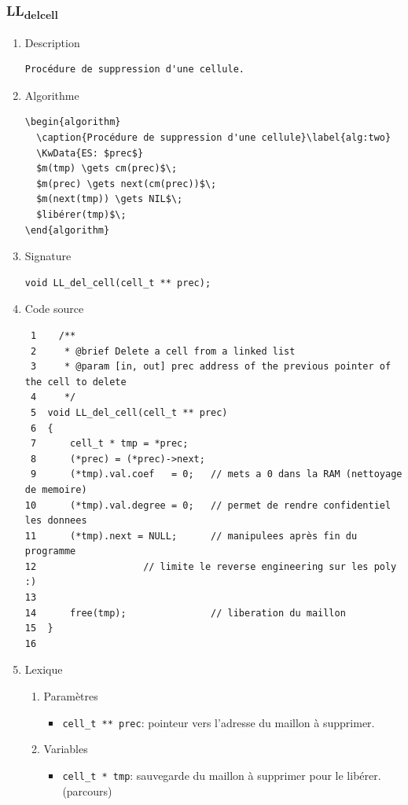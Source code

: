 \documentclass[11pt]{article}
\begin{document}
\subsubsection{LL\textsubscript{del}\textsubscript{cell}}
\label{sec:org275904f}
\begin{enumerate}
\item Description
\label{sec:org4500985}

\begin{verbatim}
Procédure de suppression d'une cellule.
\end{verbatim}

\item Algorithme
\label{sec:org0630d46}

\begin{verbatim}
\begin{algorithm}
  \caption{Procédure de suppression d'une cellule}\label{alg:two}
  \KwData{ES: $prec$}
  $m(tmp) \gets cm(prec)$\;
  $m(prec) \gets next(cm(prec))$\;
  $m(next(tmp)) \gets NIL$\;
  $libérer(tmp)$\;
\end{algorithm}
\end{verbatim}

\item Signature
\label{sec:orgd272dc8}

\begin{verbatim}
void LL_del_cell(cell_t ** prec);
\end{verbatim}

\item Code source
\label{sec:org766fffe}

\begin{verbatim}
 1    /**
 2     * @brief Delete a cell from a linked list
 3     * @param [in, out] prec address of the previous pointer of the cell to delete
 4     */
 5  void LL_del_cell(cell_t ** prec)
 6  {
 7      cell_t * tmp = *prec;
 8      (*prec) = (*prec)->next;
 9      (*tmp).val.coef   = 0;   // mets a 0 dans la RAM (nettoyage de memoire)
10      (*tmp).val.degree = 0;   // permet de rendre confidentiel les donnees
11      (*tmp).next = NULL;      // manipulees après fin du programme
12  			     // limite le reverse engineering sur les poly :)
13  
14      free(tmp);               // liberation du maillon
15  }
16  
\end{verbatim}

\item Lexique
\label{sec:org6714de9}
\begin{enumerate}
\item Paramètres
\label{sec:orgb63795e}
\begin{itemize}
\item \texttt{cell\_t ** prec}: pointeur vers l'adresse du maillon à supprimer.
\end{itemize}
\item Variables
\label{sec:orge5d0494}
\begin{itemize}
\item \texttt{cell\_t * tmp}: sauvegarde du maillon à supprimer pour le libérer. (parcours)
\end{itemize}
\end{enumerate}



\end{enumerate}
\end{document}
